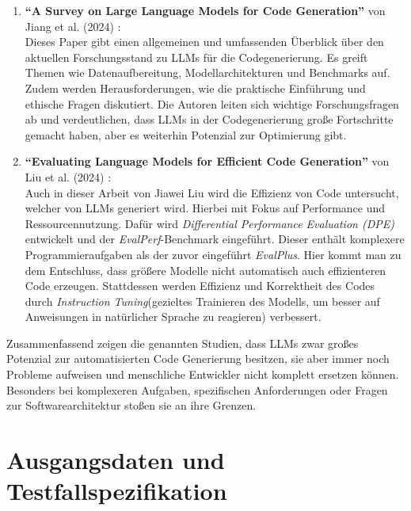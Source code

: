 \documentclass[11pt,a4paper]{article}
\begin{document}
\begin{enumerate}
\begin{figure}[H]
    \end{figure}
    \item \textbf{``A Survey on Large Language Models for Code Generation''} von Jiang et al. (2024) \cite{jiang2024surveylargelanguagemodels}:\\
    Dieses Paper gibt einen allgemeinen und umfassenden Überblick über den aktuellen Forschungsstand zu LLMs für die Codegenerierung. Es greift Themen wie Datenaufbereitung, Modellarchitekturen und Benchmarks auf. Zudem werden Herausforderungen, wie die praktische Einführung und ethische Fragen diskutiert. Die Autoren leiten sich wichtige Forschungsfragen ab und verdeutlichen, dass LLMs in der Codegenerierung große Fortschritte gemacht haben, aber es weiterhin Potenzial zur Optimierung gibt.

    \item \textbf{``Evaluating Language Models for Efficient Code Generation''} von Liu et al. (2024) \cite{liu2024evaluating}:\\
    Auch in dieser Arbeit von Jiawei Liu wird die Effizienz von Code untersucht, welcher von LLMs generiert wird. Hierbei mit Fokus auf Performance und Ressourcennutzung. Dafür wird \emph{Differential Performance Evaluation (DPE)} entwickelt und der \emph{EvalPerf}-Benchmark eingeführt. Dieser enthält komplexere Programmieraufgaben als der zuvor eingeführt \emph{EvalPlus}. Hier kommt man zu dem Entschluss, dass größere Modelle nicht automatisch auch effizienteren Code erzeugen. Stattdessen werden Effizienz und Korrektheit des Codes durch \emph{Instruction Tuning}(gezieltes Trainieren des Modells, um besser auf Anweisungen in natürlicher Sprache zu reagieren) verbessert.
\end{enumerate}
Zusammenfassend zeigen die genannten Studien, dass LLMs zwar großes Potenzial zur automatisierten Code Generierung besitzen, sie aber immer noch Probleme aufweisen und menschliche Entwickler nicht komplett ersetzen können. Besonders bei komplexeren Aufgaben, spezifischen Anforderungen oder Fragen zur Softwarearchitektur stoßen sie an ihre Grenzen.

\section{Ausgangsdaten und Testfallspezifikation}
\label{sec:spezifikation}
\end{document}
